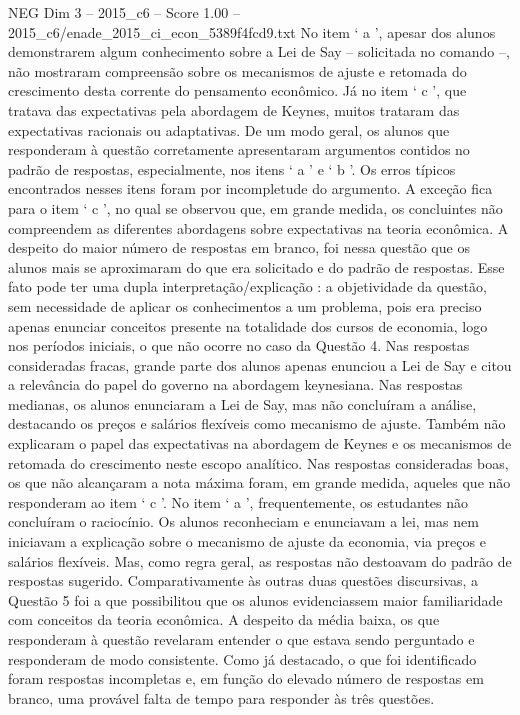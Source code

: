 \begin{textsample}{NEG Dim 3 – 2015\_c6 – Score 1.00 – 2015\_c6/enade\_2015\_ci\_econ\_5389f4fcd9.txt}
No item ‘ a ’, apesar dos alunos demonstrarem algum conhecimento sobre a Lei de Say – solicitada no comando –, não mostraram compreensão sobre os mecanismos de ajuste e retomada do crescimento desta corrente do pensamento econômico.
Já no item ‘ c ’, que tratava das expectativas pela abordagem de Keynes, muitos trataram das expectativas racionais ou adaptativas.
De um modo geral, os alunos que responderam à questão corretamente apresentaram argumentos contidos no padrão de respostas, especialmente, nos itens ‘ a ’ e ‘ b ’.
Os erros típicos encontrados nesses itens foram por incompletude do argumento.
A exceção fica para o item ‘ c ’, no qual se observou que, em grande medida, os concluintes não compreendem as diferentes abordagens sobre expectativas na teoria econômica.
A despeito do maior número de respostas em branco, foi nessa questão que os alunos mais se aproximaram do que era solicitado e do padrão de respostas.
Esse fato pode ter uma dupla interpretação/explicação : a objetividade da questão, sem necessidade de aplicar os conhecimentos a um problema, pois era preciso apenas enunciar conceitos presente na totalidade dos cursos de economia, logo nos períodos iniciais, o que não ocorre no caso da Questão 4.
Nas respostas consideradas fracas, grande parte dos alunos apenas enunciou a Lei de Say e citou a relevância do papel do governo na abordagem keynesiana.
Nas respostas medianas, os alunos enunciaram a Lei de Say, mas não concluíram a análise, destacando os preços e salários flexíveis como mecanismo de ajuste.
Também não explicaram o papel das expectativas na abordagem de Keynes e os mecanismos de retomada do crescimento neste escopo analítico.
Nas respostas consideradas boas, os que não alcançaram a nota máxima foram, em grande medida, aqueles que não responderam ao item ‘ c ’.
No item ‘ a ’, frequentemente, os estudantes não concluíram o raciocínio.
Os alunos reconheciam e enunciavam a lei, mas nem iniciavam a explicação sobre o mecanismo de ajuste da economia, via preços e salários flexíveis.
Mas, como regra geral, as respostas não destoavam do padrão de respostas sugerido.
Comparativamente às outras duas questões discursivas, a Questão 5 foi a que possibilitou que os alunos evidenciassem maior familiaridade com conceitos da teoria econômica.
A despeito da média baixa, os que responderam à questão revelaram entender o que estava sendo perguntado e responderam de modo consistente.
Como já destacado, o que foi identificado foram respostas incompletas e, em função do elevado número de respostas em branco, uma provável falta de tempo para responder às três questões.

\end{textsample}
